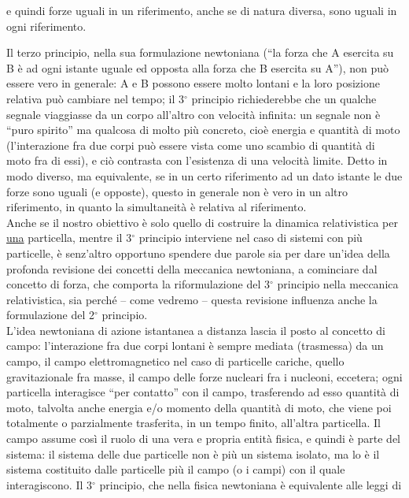 e quindi forze uguali in un riferimento, anche se di natura diversa, sono uguali
in ogni riferimento.

Il terzo principio, nella sua formulazione newtoniana (``la forza che A esercita
su B \`e ad ogni istante uguale ed opposta alla forza che B esercita su A''),
non pu\`o essere vero in generale: A e B possono essere molto lontani e la loro
posizione relativa pu\`o cambiare nel tempo; il 3$^\circ$ principio
richiederebbe che un qualche segnale viaggiasse da un corpo all'altro con
velocit\`a infinita: un segnale non \`e ``puro spirito'' ma qualcosa di molto
pi\`u concreto, cio\`e energia e quantit\`a di moto (l'interazione fra due corpi
pu\`o essere vista come uno scambio di quantit\`a di moto fra di essi), e ci\`o
contrasta con l'esistenza di una velocit\`a limite. Detto in modo diverso, ma
equivalente, se in un certo riferimento ad un dato istante le due forze sono
uguali (e opposte), questo in generale non \`e vero in un altro riferimento, in
quanto la simultaneit\`a \`e relativa al riferimento.\\
Anche se il nostro obiettivo \`e solo quello di costruire la dinamica
relativistica per \underline{una} particella, mentre il 3$^\circ$ principio
interviene nel caso di sistemi con pi\`u particelle, \`e senz'altro opportuno
spendere due parole sia per dare un'idea della profonda revisione dei concetti
della meccanica newtoniana, a cominciare dal concetto di forza, che comporta la
riformulazione del 3$^\circ$ principio nella meccanica relativistica, sia
perch\'e -- come vedremo -- questa revisione influenza anche la formulazione del
2$^\circ$ principio.\\
L'idea newtoniana di azione istantanea a distanza lascia il posto al concetto di
campo: l'interazione fra due corpi lontani \`e sempre mediata (trasmessa) da un
campo, il campo elettromagnetico nel caso di particelle cariche, quello
gravitazionale fra masse, il campo delle forze nucleari fra i nucleoni,
eccetera; ogni particella interagisce ``per contatto'' con il campo, trasferendo
ad esso quantit\`a di moto, talvolta anche energia e/o momento della quantit\`a
di moto, che viene poi totalmente o parzialmente trasferita, in un tempo finito,
all'altra particella. Il campo assume cos\`i il ruolo di una vera e propria
entit\`a fisica, e quindi \`e parte del sistema: il sistema delle due particelle
non \`e pi\`u un sistema isolato, ma lo \`e il sistema costituito dalle
particelle pi\`u il campo (o i campi) con il quale interagiscono. Il 3$^\circ$
principio, che nella fisica newtoniana \`e equivalente alle leggi di
